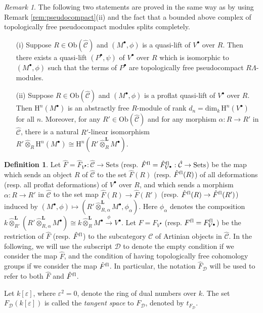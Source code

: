 \documentclass{amsart}
\theoremstyle{plain}
\theoremstyle{definition}
\newtheorem{dfn}[thm]{Definition}
\theoremstyle{remark}
\newtheorem{rem}[thm]{Remark}
\begin{document}
\begin{rem}
\label{rem:profree}
The following two statements are proved in the same way as \cite[Lemmas 2.9 and 2.11]{bcderived}
by using Remark \ref{rem:pseudocompact}(ii) and the fact that
a bounded above complex of topologically free pseudocompact modules splits completely.
\begin{enumerate} 
\item[(i)] Suppose $R \in \mathrm{Ob}(\hat{\mathcal{C}})$ and $(M^\bullet,\phi)$ is a quasi-lift of $V^\bullet$ 
over $R$. Then there exists a quasi-lift $(P^\bullet,\psi)$ of $V^\bullet$ over $R$ which is isomorphic to 
$(M^\bullet,\phi)$ such that the terms of $P^\bullet$ are topologically free pseudocompact 
$R\Lambda$-modules.
\item[(ii)] Suppose $R \in \mathrm{Ob}(\hat{\mathcal{C}})$ and $(M^\bullet,\phi)$ is a proflat quasi-lift of 
$V^\bullet$ over $R$. Then ${\mathrm{H}}^n(M^\bullet)$ is an abstractly free $R$-module of rank $d_n=
\mathrm{dim}_k\,{\mathrm{H}}^n(V^\bullet)$ for all $n$.
Moreover, for any $R'\in\mathrm{Ob}(\hat{\mathcal{C}})$ and for any morphism 
$\alpha:R\to R'$ in $\hat{\mathcal{C}}$, there is a natural
$R'$-linear isomorphism $R'\hat{\otimes}_R {\mathrm{H}}^n(M^\bullet) \cong {\mathrm{H}}^n(R'\hat{\otimes}_R^{\mathbf{L}} 
M^\bullet)$.
\end{enumerate}
\end{rem}

\begin{dfn}
\label{def:functordef}
Let $\hat{F} = \hat{F}_{V^\bullet}:\hat{\mathcal{C}} \to \mathrm{Sets}$
(resp. $\hat{F}^{\mathrm{f\/l}} = \hat{F}^{\mathrm{f\/l}}_{V^\bullet}:\hat{\mathcal{C}} \to \mathrm{Sets}$)
be the map which sends an object $R$ of $\hat{\mathcal{C}}$ to the set
$\hat{F}(R)$ (resp. $\hat{F}^{\mathrm{f\/l}}(R)$) of all deformations (resp. all proflat deformations)
of $V^\bullet$ over $R$, and which sends
a morphism $\alpha:R\to R'$ in $\hat{\mathcal{C}}$ to the set map
$\hat{F}(R)\to \hat{F}(R')$ (resp. $\hat{F}^{\mathrm{f\/l}}(R)\to \hat{F}^{\mathrm{f\/l}}(R')$)
induced by $(M^\bullet,\phi) \mapsto (R'\hat{\otimes}_{R,\alpha}^{\mathbf{L}}
M^\bullet,\phi_\alpha)$. Here $\phi_\alpha$ denotes the composition
$k\hat{\otimes}^{\mathbf{L}}_{R'} (R'\hat{\otimes}_{R,\alpha}^{\mathbf{L}} M^\bullet)
\cong k \hat{\otimes}^{\mathbf{L}}_R M^\bullet \xrightarrow{\phi} V^\bullet$.
Let $F = F_{V^\bullet}$ (resp. $F^{\mathrm{f\/l}} = F^{\mathrm{f\/l}}_{V^\bullet}$)
be the restriction of $\hat{F}$ (resp. $\hat{F}^{\mathrm{f\/l}}$) to the subcategory $\mathcal{C}$
of Artinian objects in $\hat{\mathcal{C}}$.
In the following, we will use the subscript $\mathcal{D}$ to denote the empty
condition if we consider the map $\hat{F}$, and the condition of having
topologically free cohomology groups
if we consider the map $\hat{F}^{\mathrm{f\/l}}$. In particular, the notation $\hat{F}_{\mathcal{D}}$
will be used to refer to both $\hat{F}$ and $\hat{F}^{\mathrm{f\/l}}$.

Let $k[\varepsilon]$, where $\varepsilon^2=0$, denote the ring of dual numbers over
$k$. The set $F_{\mathcal{D}}(k[\varepsilon])$ is called the \emph{tangent space} to 
$F_{\mathcal{D}}$, denoted by $t_{F_{\mathcal{D}}}$. 
\end{dfn}
\end{document}
